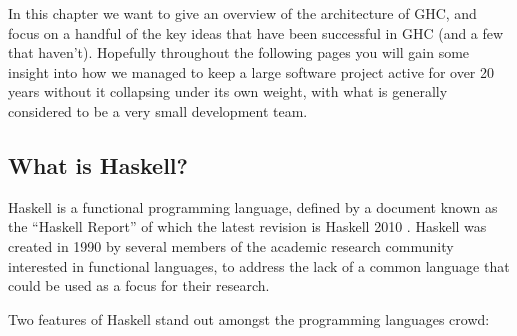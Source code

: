 \documentclass{article}
\let\cite=\citep
\begin{document}
In this chapter we want to give an overview of the architecture of
GHC, and focus on a handful of the key ideas that have been successful
in GHC (and a few that haven't).  Hopefully throughout the following
pages you will gain some insight into how we managed to keep a large
software project active for over 20 years without it collapsing under
its own weight, with what is generally considered to be a very small
development team.

% 
% 
% 
% 

%

\subsection{What is Haskell?}

Haskell is a functional programming language, defined by a document
known as the ``Haskell Report'' of which the latest revision is
Haskell 2010 \cite{haskell2010}.  Haskell was created in 1990 by several
members of the academic research community interested in functional
languages, to address the lack of a common language that could be used
as a focus for their research.

Two features of Haskell stand out amongst the programming languages
crowd:
\end{document}

